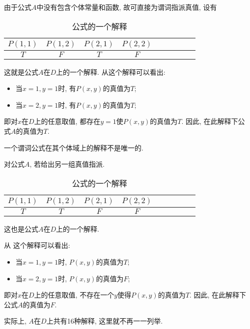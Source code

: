 \begin{result}
由于公式$A$中没有包含个体常量和函数, 故可直接为谓词指派真值, 设有
\begin{table}[H]
\caption{公式的一个解释}
\vspace{-0.6cm}
\begin{center}
\begin{tabular} {ccccccccc}
  \hline
     $P(1,1)$&	  $P(1,2)$	&   $P(2,1)$&	   $P(2,2)$\\
  \hline
     \textcolor[rgb]{0,0,1}{$T$}	&      $F$	  &  \textcolor[rgb]{0,0,1}{$T$}	    &   $F$\\
\hline
\end{tabular}
\end{center}
\label{AI_table2019113001}
\end{table}
这就是公式$A$在$D$上的一个解释. 从这个解释可以看出:
\begin{itemize}
\item 当$x=1, y=1$时, 有$P(x,y)$的真值为$T$;
\item 当$x=2, y=1$时, 有$P(x,y)$的真值为$T$;
\end{itemize}
即对$x$在$D$上的任意取值, 都存在$y=1$使$P(x,y)$的真值为$T$. 因此, 在此解释下公式$A$的真值为$T$.
\begin{remark}
  一个谓词公式在其个体域上的解释不是唯一的.
\begin{example}
对公式$A$, 若给出另一组真值指派.
\begin{table}[H]
\caption{公式的一个解释}
\vspace{-0.6cm}
\begin{center}
\begin{tabular} {ccccccccc}
\hline
     $P(1,1)$&	  $P(1,2)$	&   $P(2,1)$&	   $P(2,2)$\\
\hline
     $T$	&      $T$	  &   $F$	    &   $F$\\
\hline
\end{tabular}
\end{center}
\label{AI_table2019113002}
\end{table}
这也是公式$A$在$D$上的一个解释.
\end{example}
\end{remark}
从 这个解释可以看出:
\begin{itemize}
\item 当$x=1,y=1$时, $P(x,y)$的真值为$T$;
\item 当$x=2,y=1$时, $P(x,y)$的真值为$F$;
\end{itemize}
即对$x$在$D$上的任意取值, 不存在一个$y$使得$P(x,y)$的真值为$T$. 因此, 在此解释下公式$A$的真值为$F$.
\begin{remark}
    实际上, $A$在$D$上共有16种解释, 这里就不再一一列举.
\end{remark}
\end{result}
